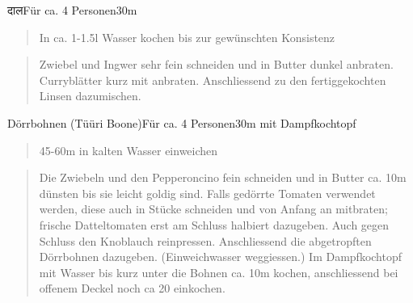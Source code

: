 \documentclass[
  a4paper,
]{article}
\begin{document}
\newpage

\begin{recipe}{\Dev दाल}{Für ca. 4 Personen}{30m}


\begin{quote}
In ca. 1-1.5l Wasser kochen bis zur gewünschten Konsistenz
\end{quote}

\freeform\hrulefill


\begin{quote}
Zwiebel und Ingwer sehr fein schneiden und in Butter dunkel anbraten.
Curryblätter kurz mit anbraten. Anschliessend zu den fertiggekochten
Linsen dazumischen.
\end{quote}

\freeform\hrulefill\newline{}\end{recipe}

\newpage

\begin{recipe}{Dörrbohnen (Tüüri Boone)}{Für ca. 4 Personen}{30m mit Dampfkochtopf}


\begin{quote}
45-60m in kalten Wasser einweichen
\end{quote}

\freeform\hrulefill


\begin{quote}
Die Zwiebeln und den Pepperoncino fein schneiden und in Butter ca. 10m
dünsten bis sie leicht goldig sind. Falls gedörrte Tomaten verwendet
werden, diese auch in Stücke schneiden und von Anfang an mitbraten;
frische Datteltomaten erst am Schluss halbiert dazugeben. Auch gegen
Schluss den Knoblauch reinpressen. Anschliessend die abgetropften
Dörrbohnen dazugeben. (Einweichwasser weggiessen.) Im Dampfkochtopf mit
Wasser bis kurz unter die Bohnen ca. 10m kochen, anschliessend bei
offenem Deckel noch ca 20 einkochen.
\end{quote}

\freeform\hrulefill\newline\freeform{}\end{recipe}
\end{document}
